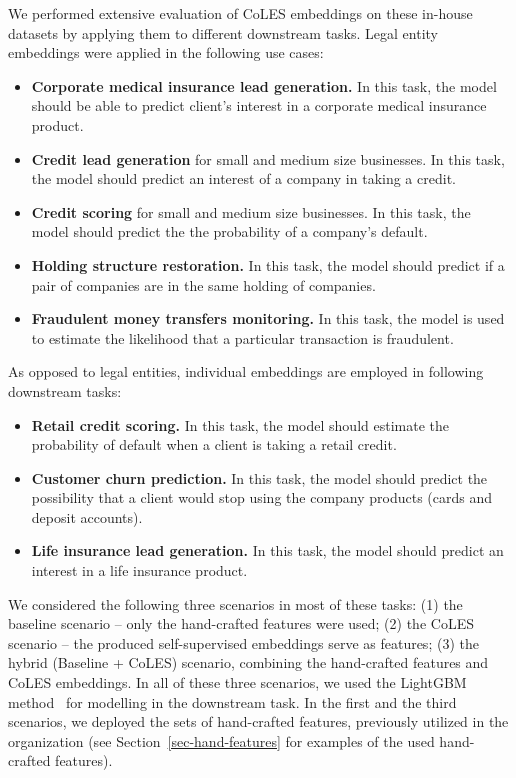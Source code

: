 \documentclass[sigconf]{acmart}
\begin{document}
We performed extensive evaluation of CoLES embeddings on these in-house datasets by applying
them to different downstream tasks. Legal entity embeddings were applied in the following
use cases:
\begin{itemize}
    \item \textbf{Corporate medical insurance lead generation.}
    In this task, the model should be able to predict client's interest in a corporate medical insurance product.

    \item \textbf{Credit lead generation} for small and medium size businesses.
    In this task, the model should predict an interest of a company in taking a credit.

    \item \textbf{Credit scoring} for small and medium size businesses.
    In this task, the model should predict the the probability of a company's default.

    \item \textbf{Holding structure restoration.}
    In this task, the model should predict if a pair of companies are in the same holding of companies.

    \item \textbf{Fraudulent money transfers monitoring.}
    In this task, the model is used to estimate the likelihood that a particular transaction is fraudulent.
\end{itemize}
%
As opposed to legal entities, individual embeddings are employed in following downstream tasks:
\begin{itemize}
    \item \textbf{Retail credit scoring.}
    In this task, the model should estimate the probability of default when a client is taking a retail credit.

    \item \textbf{Customer churn prediction.}
    In this task, the model should predict the possibility that a client would stop using the company
    products (cards and deposit accounts).

    \item \textbf{Life insurance lead generation.}
    In this task, the model should predict an interest in a life insurance product.
\end{itemize}

We considered the following three scenarios in most of these tasks:
(1) the baseline scenario -- only the hand-crafted features were used;
(2) the CoLES scenario -- the produced self-supervised embeddings serve as features;
(3) the hybrid (Baseline + CoLES) scenario, combining the hand-crafted features and CoLES embeddings.
% 
In all of these three scenarios, we used the LightGBM method~\citep{Ke2017LightGBMAH} for modelling
in the downstream task. In the first and the third scenarios, we deployed the sets of hand-crafted
features, previously utilized in the organization (see Section~\ref{sec-hand-features} for examples
of the used hand-crafted features).
%
\end{document}
